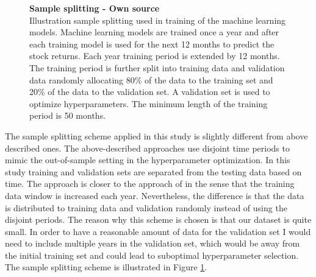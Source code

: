 \documentclass[12pt]{article}
\begin{document}
\begin{figure}[ht]
\centering
\caption[Sample splitting scheme]{\textbf{Sample splitting \textnormal{- Own source}}\\ Illustration sample splitting used in training of the machine learning models. Machine learning models are trained once a year and after each training model is used for the next 12 months to predict the stock returns. Each year training period is extended by 12 months. The training period is further split into training data and validation data randomly allocating 80\% of the data to the training set and 20\% of the data to the validation set. A validation set is used to optimize hyperparameters. The minimum length of the training period is 50 months.}
\label{plot:SampleSplitting}
\end{figure}

The sample splitting scheme applied in this study is slightly different from above described ones. The above-described approaches use disjoint time periods to mimic the out-of-sample setting in the hyperparameter optimization. In this study training and validation sets are separated from the testing data based on time. The approach is closer to the approach of \citet{guetal} in the sense that the training data window is increased each year.\footnotemark {} Nevertheless, the difference is that the data is distributed to training data and validation randomly instead of using the disjoint periods. The reason why this scheme is chosen is that our dataset is quite small. In order to have a reasonable amount of data for the validation set I would need to include multiple years in the validation set, which would be away from the initial training set and could lead to suboptimal hyperparameter selection. The sample splitting scheme is illustrated in Figure \ref{plot:SampleSplitting}. \par
\end{document}
